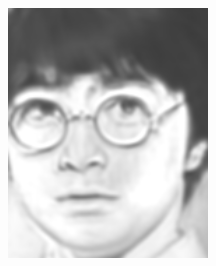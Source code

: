 \documentclass[10pt,twocolumn,letterpaper]{article}
\begin{document}
\begin{figure}[htbp]
{\begin{minipage}[b]{0.22\linewidth}
\includegraphics[width=0.99\linewidth]{img/real_world_photos/fcnn_r4.png}
\end{minipage}
}
\end{figure}
\end{document}
